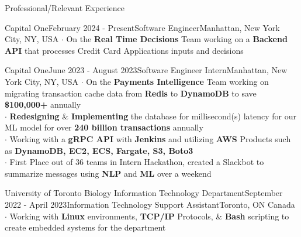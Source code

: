 \documentclass[UTF8]{resume} %
\begin{document}
\begin{rSection}{Professional/Relevant Experience}
\begin{rSubsection}{Capital One}{February 2024 - Present}{Software Engineer}{Manhattan, New York City, NY, USA}
   $\cdot$ On the \textbf{Real Time Decisions} Team working on a \textbf{Backend API} that processes Credit Card Applications inputs and decisions 
\end{rSubsection}
\begin{rSubsection}{Capital One}{June 2023 - August 2023}{Software Engineer Intern}{Manhattan, New York City, NY, USA}
    $\cdot$ On the \textbf{Payments Intelligence} Team working on migrating transaction cache data from \textbf{Redis} to \textbf{DynamoDB} to save \textbf{\$100,000+} annually\\
    $\cdot$ \textbf{Redesigning} \& \textbf{Implementing} the database for millisecond(s) latency for our ML model for over \textbf{240 billion transactions} annually \\
    $\cdot$ Working with a \textbf{gRPC API} with \textbf{Jenkins} and utilizing \textbf{AWS} Products such as \textbf{DynamoDB, EC2, ECS, Fargate, S3, Boto3} \\
    $\cdot$ First Place out of 36 teams in Intern Hackathon, created a Slackbot to summarize messages using \textbf{NLP} and \textbf{ML} over a weekend
\end{rSubsection}
\begin{rSubsection}{University of Toronto Biology Information Technology Department}{September 2022 - April 2023}{Information Technology Support Assistant}{Toronto, ON Canada}
    $\cdot$ Working with \textbf{Linux} environments, \textbf{TCP/IP} Protocols, \& \textbf{Bash} scripting to create embedded systems for the department \\

\end{rSubsection}
\end{rSection}
\end{document}
